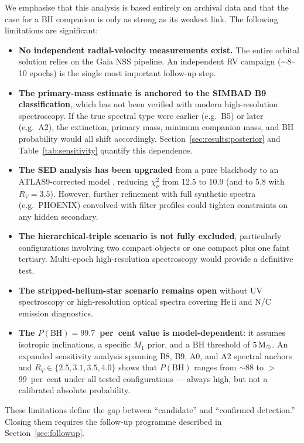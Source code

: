 \documentclass[usenatbib,fleqn]{mnras}
\newcommand{\Msun}{{\rm M}_\odot}
\begin{document}
We emphasise that this analysis is based entirely on archival data
and that the case for a BH companion is only as strong as its
weakest link.  The following limitations are significant:
\begin{itemize}
\item \textbf{No independent radial-velocity measurements exist.}
  The entire orbital solution relies on the Gaia NSS pipeline.
  An independent RV campaign ($\sim$8--10 epochs) is the single
  most important follow-up step.
\item \textbf{The primary-mass estimate is anchored to the SIMBAD
  B9 classification}, which has not been verified with modern
  high-resolution spectroscopy.  If the true spectral type were
  earlier (e.g.\ B5) or later (e.g.\ A2), the extinction,
  primary mass, minimum companion mass, and BH probability would
  all shift accordingly.  Section~\ref{sec:results:posterior} and
  Table~\ref{tab:sensitivity} quantify this dependence.
\item \textbf{The SED analysis has been upgraded} from a pure
  blackbody to an ATLAS9-corrected model
  \citep{CastelliKurucz2004}, reducing $\chi^2_\nu$ from 12.5
  to 10.9 (and to 5.8 with $R_V = 3.5$).  However, further
  refinement with full synthetic spectra (e.g.\ PHOENIX) convolved
  with filter profiles could tighten constraints on any hidden
  secondary.
\item \textbf{The hierarchical-triple scenario is not fully
  excluded}, particularly configurations involving two compact
  objects or one compact plus one faint tertiary.  Multi-epoch
  high-resolution spectroscopy would provide a definitive test.
\item \textbf{The stripped-helium-star scenario remains open}
  without UV spectroscopy or high-resolution optical spectra
  covering He\,{\sc ii} and N/C emission diagnostics.
\item \textbf{The $P(\text{BH}) = 99.7$~per~cent value is
  model-dependent}: it assumes isotropic inclinations, a specific
  $M_1$ prior, and a BH threshold of $5\,\Msun$.
  An expanded sensitivity analysis spanning B8, B9, A0, and A2
  spectral anchors and $R_V \in \{2.5, 3.1, 3.5, 4.0\}$ shows
  that $P(\text{BH})$ ranges from $\sim$88 to $>$\,99~per~cent
  under all tested configurations --- always high, but not
  a calibrated absolute probability.
\end{itemize}
These limitations define the gap between ``candidate''
and ``confirmed detection.''  Closing them requires the follow-up
programme described in Section~\ref{sec:followup}.
\end{document}
